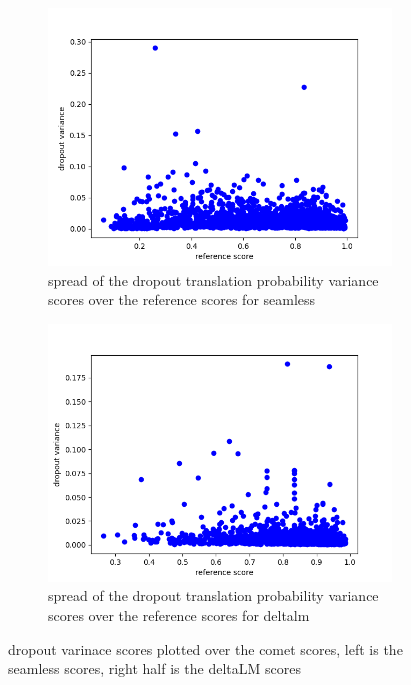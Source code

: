 \begin{figure}[ht]
        \centering%
        \begin{subfigure}{0.4\linewidth}
        \includegraphics[width=\textwidth]{Latex/sections/images/seamlessdropoutvariance.png}
        \caption{spread of the dropout translation probability variance scores over the reference scores for seamless}
    \end{subfigure}
    \begin{subfigure}{0.4\linewidth}
        \includegraphics[width=\textwidth]{Latex/sections/images/dlmdropoutvariance.png}
        \caption{spread of the dropout translation probability variance scores over the reference scores for deltalm}
    \end{subfigure}
        \caption{dropout varinace scores plotted over the comet scores, left is the seamless scores, right half is the deltaLM scores}
        \label{fig:dropout translation variance score}
\end{figure}
    
